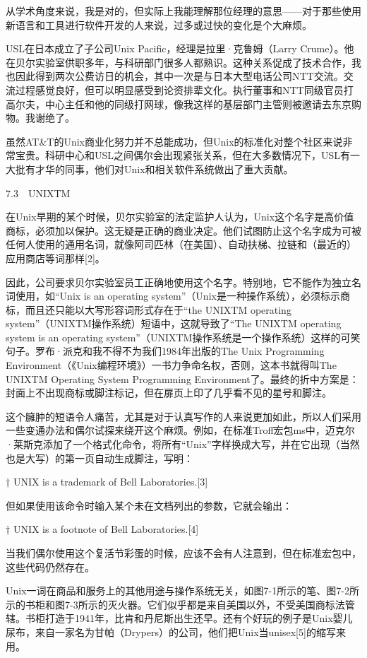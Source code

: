 \documentclass[a4paper,12pt,UTF8,twoside]{ctexbook}
\begin{document}
从学术角度来说，我是对的，但实际上我能理解那位经理的意思——对于那些使用新语言和工具进行软件开发的人来说，过多或过快的变化是个大麻烦。

USL在日本成立了子公司Unix Pacific，经理是拉里·克鲁姆（Larry Crume）。他在贝尔实验室供职多年，与科研部门很多人都熟识。这种关系促成了技术合作，我也因此得到两次公费访日的机会，其中一次是与日本大型电话公司NTT交流。交流过程感觉良好，但可以明显感受到论资排辈文化。执行董事和NTT同级官员打高尔夫，中心主任和他的同级打网球，像我这样的基层部门主管则被邀请去东京购物。我谢绝了。

虽然AT\&T的Unix商业化努力并不总能成功，但Unix的标准化对整个社区来说非常宝贵。科研中心和USL之间偶尔会出现紧张关系，但在大多数情况下，USL有一大批有才华的同事，他们对Unix和相关软件系统做出了重大贡献。





7.3　UNIXTM


在Unix早期的某个时候，贝尔实验室的法定监护人认为，Unix这个名字是高价值商标，必须加以保护。这无疑是正确的商业决定。他们试图防止这个名字成为可被任何人使用的通用名词，就像阿司匹林（在美国）、自动扶梯、拉链和（最近的）应用商店等词那样[2]。

因此，公司要求贝尔实验室员工正确地使用这个名字。特别地，它不能作为独立名词使用，如“Unix is an operating system”（Unix是一种操作系统），必须标示商标，而且还只能以大写形容词形式存在于“the UNIXTM operating system”（UNIXTM操作系统）短语中，这就导致了“The UNIXTM operating system is an operating system”（UNIXTM操作系统是一个操作系统）这样的可笑句子。罗布·派克和我不得不为我们1984年出版的The Unix Programming Environment（《Unix编程环境》）一书力争命名权，否则，这本书就得叫The UNIXTM Operating System Programming Environment了。最终的折中方案是：封面上不出现商标或脚注标记，但在扉页上印了几乎看不见的星号和脚注。

这个臃肿的短语令人痛苦，尤其是对于认真写作的人来说更加如此，所以人们采用一些变通办法和偶尔试探来绕开这个麻烦。例如，在标准Troff宏包ms中，迈克尔·莱斯克添加了一个格式化命令，将所有“Unix”字样换成大写，并在它出现（当然也是大写）的第一页自动生成脚注，写明：

† UNIX is a trademark of Bell Laboratories.[3]

但如果使用该命令时输入某个未在文档列出的参数，它就会输出：

† UNIX is a footnote of Bell Laboratories.[4]

当我们偶尔使用这个复活节彩蛋的时候，应该不会有人注意到，但在标准宏包中，这些代码仍然存在。

Unix一词在商品和服务上的其他用途与操作系统无关，如图7-1所示的笔、图7-2所示的书柜和图7-3所示的灭火器。它们似乎都是来自美国以外，不受美国商标法管辖。书柜打造于1941年，比肯和丹尼斯出生还早。还有个好玩的例子是Unix婴儿尿布，来自一家名为甘帕（Drypers）的公司，他们把Unix当unisex[5]的缩写来用。
\end{document}
